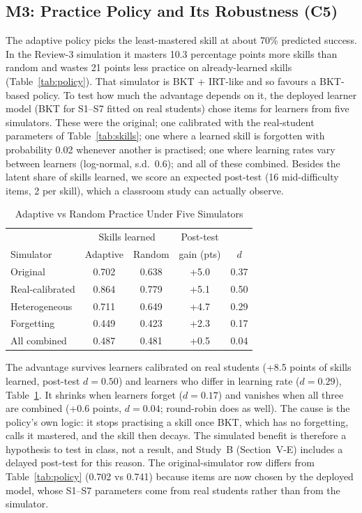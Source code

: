 \documentclass[conference]{IEEEtran}
\begin{document}
\subsection{M3: Practice Policy and Its Robustness (C5)}
The adaptive policy picks the least-mastered skill at about 70\% predicted success. In the Review-3 simulation it masters 10.3 percentage points more skills than random and wastes 21 points less practice on already-learned skills (Table~\ref{tab:policy}). That simulator is BKT + IRT-like and so favours a BKT-based policy. To test how much the advantage depends on it, the deployed learner model (BKT for S1--S7 fitted on real students) chose items for learners from five simulators. These were the original; one calibrated with the real-student parameters of Table~\ref{tab:skills}; one where a learned skill is forgotten with probability 0.02 whenever another is practised; one where learning rates vary between learners (log-normal, s.d.\ 0.6); and all of these combined. Besides the latent share of skills learned, we score an expected post-test (16 mid-difficulty items, 2 per skill), which a classroom study can actually observe.

\begin{table}[!t]
\caption{Adaptive vs Random Practice Under Five Simulators}
\label{tab:robust}
\centering
\footnotesize
\begin{tabular}{lcccc}
\toprule
 & \multicolumn{2}{c}{Skills learned} & Post-test & \\
Simulator & Adaptive & Random & gain (pts) & $d$\\
\midrule
Original & 0.702 & 0.638 & +5.0 & 0.37\\
Real-calibrated & 0.864 & 0.779 & +5.1 & 0.50\\
Heterogeneous & 0.711 & 0.649 & +4.7 & 0.29\\
Forgetting & 0.449 & 0.423 & +2.3 & 0.17\\
All combined & 0.487 & 0.481 & +0.5 & 0.04\\
\bottomrule
\end{tabular}
\end{table}

The advantage survives learners calibrated on real students (+8.5 points of skills learned, post-test $d=0.50$) and learners who differ in learning rate ($d=0.29$), Table~\ref{tab:robust}. It shrinks when learners forget ($d=0.17$) and vanishes when all three are combined (+0.6 points, $d=0.04$; round-robin does as well). The cause is the policy's own logic: it stops practising a skill once BKT, which has no forgetting, calls it mastered, and the skill then decays. The simulated benefit is therefore a hypothesis to test in class, not a result, and Study~B (Section~V-E) includes a delayed post-test for this reason. The original-simulator row differs from Table~\ref{tab:policy} (0.702 vs 0.741) because items are now chosen by the deployed model, whose S1--S7 parameters come from real students rather than from the simulator.
\end{document}
